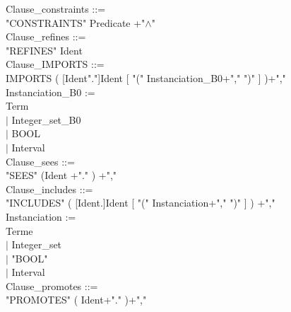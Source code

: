 \documentclass[12pt,a4paper,draft]{report}
\begin{document}
\small{
\begin{sloppypar}

\noindent Clause\_constraints ::= \\
  "CONSTRAINTS" Predicate +"$\land$"\\
Clause\_refines ::=\\ 
  "REFINES" Ident \\
Clause\_IMPORTS ::= \\
   IMPORTS ( [Ident"."]Ident  [ "(" Instanciation\_B0+"," ")" ] )+","\\
Instanciation\_B0 := \\
\hspace*{0.20in}    Term\\
\hspace*{0.20in} $|$  Integer\_set\_B0\\
\hspace*{0.20in} $|$  BOOL\\
\hspace*{0.20in} $|$  Interval\\
Clause\_sees ::= \\
  "SEES" (Ident +"." ) +","\\
Clause\_includes ::= \\
  "INCLUDES" ( [Ident.]Ident  [ "(" Instanciation+","  ")" ] ) +","\\
Instanciation := \\
\hspace*{0.20in}    Terme\\
\hspace*{0.20in} $|$  Integer\_set\\
\hspace*{0.20in} $|$ "BOOL"\\
\hspace*{0.20in} $|$  Interval \\
Clause\_promotes ::= \\
   "PROMOTES" ( Ident+"." )+","\\


\end{sloppypar}}
\end{document}
